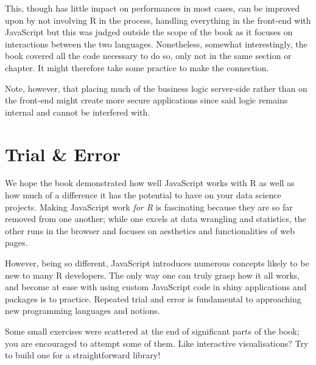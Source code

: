 \documentclass[10pt,]{krantz}
\makeatletter
\newenvironment{Shaded}{\begin{snugshade}}{\end{snugshade}}
\newcommand{\AttributeTok}[1]{\textcolor[rgb]{0.61,0.61,0.61}{#1}}
\newcommand{\CommentTok}[1]{\textcolor[rgb]{0.37,0.37,0.37}{\textit{#1}}}
\newcommand{\KeywordTok}[1]{\textcolor[rgb]{0.27,0.27,0.27}{\textbf{#1}}}
\newcommand{\NormalTok}[1]{#1}
\newcommand{\OperatorTok}[1]{\textcolor[rgb]{0.43,0.43,0.43}{\textbf{#1}}}
\newcommand{\StringTok}[1]{\textcolor[rgb]{0.5,0.5,0.5}{#1}}
\newenvironment{kframe}{%
\medskip{}
\setlength{\fboxsep}{.8em}
 \def\at@end@of@kframe{}%
 \ifinner\ifhmode%
  \def\at@end@of@kframe{\end{minipage}}%
  \begin{minipage}{\columnwidth}%
 \fi\fi%
 \def\FrameCommand##1{\hskip\@totalleftmargin \hskip-\fboxsep
 \colorbox{shadecolor}{##1}\hskip-\fboxsep
     \hskip-\linewidth \hskip-\@totalleftmargin \hskip\columnwidth}%
 \MakeFramed {\advance\hsize-\width
   \@totalleftmargin\z@ \linewidth\hsize
   \@setminipage}}%
 {\par\unskip\endMakeFramed%
 \at@end@of@kframe}
\renewenvironment{Shaded}{\begin{kframe}}{\end{kframe}}
\makeatother
\begin{document}
This, though has little impact on performances in most cases, can be improved upon by not involving R in the process, handling everything in the front-end with JavaScript but this was judged outside the scope of the book as it focuses on interactions between the two languages. Nonetheless, somewhat interestingly, the book covered all the code necessary to do so, only not in the same section or chapter. It might therefore take some practice to make the connection.

\begin{Shaded}
\end{Shaded}

Note, however, that placing much of the business logic server-side rather than on the front-end might create more secure applications since said logic remains internal and cannot be interfered with.

\hypertarget{conclusion-trial-and-error}{%
\section{Trial \& Error}\label{conclusion-trial-and-error}}

We hope the book demonstrated how well JavaScript works with R as well as how much of a difference it has the potential to have on your data science projects. Making JavaScript work \emph{for R} is fascinating because they are so far removed from one another; while one excels at data wrangling and statistics, the other runs in the browser and focuses on aesthetics and functionalities of web pages.

However, being so different, JavaScript introduces numerous concepts likely to be new to many R developers. The only way one can truly grasp how it all works, and become at ease with using custom JavaScript code in shiny applications and packages is to practice. Repeated trial and error is fundamental to approaching new programming languages and notions.

Some small exercises were scattered at the end of significant parts of the book; you are encouraged to attempt some of them. Like interactive visualisations? Try to build one for a straightforward library!
\end{document}
